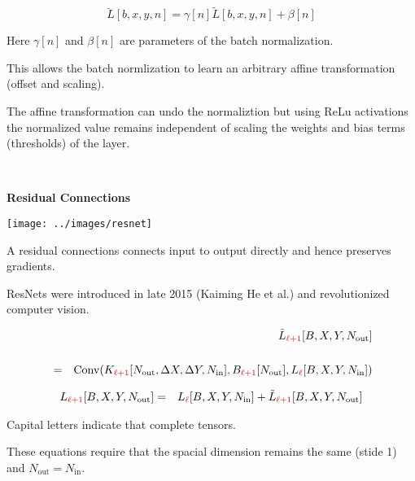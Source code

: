{

$$\breve{L}[b,x,y,n] = \gamma[n] \tilde{L}[b,x,y,n] + \beta[n]$$

\vfill
Here $\gamma[n]$ and $\beta[n]$ are parameters of the batch normalization.

\vfill
This allows the batch normlization to learn an arbitrary affine transformation (offset and scaling).

\vfill
The affine transformation can undo the normaliztion but using ReLu activations the normalized value remains independent of scaling the weights and
bias terms (thresholds) of the layer.

\vfill
\eject
~ \vfill
\centerline{\bf Residual Connections}
\vfill
\vfill


\vfill
\texttt{[image: ../images/resnet]}
\hfill \begin{minipage}[b]{4in}
  A residual connections connects input to output directly and hence preserves gradients.

  \bigskip
  ResNets were introduced in late 2015 (Kaiming He et al.) and revolutionized computer vision.
\end{minipage}


\medskip
\begin{eqnarray*}
& & \tilde{L}_{\color{red} \ell+1}[B,X,Y,N_{\mathrm{out}}] \\
\\
& = & \mathrm{Conv}(K_{\color{red} \ell+1}[N_{\mathrm{out}},\Delta X,\Delta Y,N_{\mathrm{in}}],B_{\color{red} \ell+1}[N_{\mathrm{out}}],L_{\color{red} \ell}[B,X,Y,N_{\mathrm{in}}])
\end{eqnarray*}

\begin{eqnarray*}
L_{\color{red} \ell+1}[B,X,Y,N_{\mathrm{out}}] & = & L_{\color{red}\ell}[B,X,Y,N_{\mathrm{in}}] + \tilde{L}_{\color{red} \ell+1}[B,X,Y,N_{\mathrm{out}}]
\end{eqnarray*}

\vfill Capital letters indicate that complete tensors.

\vfill These equations require that the spacial dimension remains the same (stide 1) and $N_{\mathrm{out}} = N_{\mathrm{in}}$.


}
